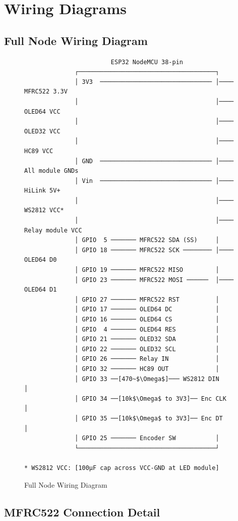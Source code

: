 \chapter{Wiring Diagrams}
\label{app:wiring}

\section{Full Node Wiring Diagram}

\begin{figure}[H]
\centering
\begin{verbatim}
                        ESP32 NodeMCU 38-pin
              ┌──────────────────────────────────────┐
              │ 3V3  ─────────────────────────────── │──── MFRC522 3.3V
              │                                      │──── OLED64 VCC
              │                                      │──── OLED32 VCC
              │                                      │──── HC89 VCC
              │ GND  ─────────────────────────────── │──── All module GNDs
              │ Vin  ─────────────────────────────── │──── HiLink 5V+
              │                                      │──── WS2812 VCC*
              │                                      │──── Relay module VCC
              │ GPIO  5 ─────── MFRC522 SDA (SS)     │
              │ GPIO 18 ─────── MFRC522 SCK ──────── │──── OLED64 D0
              │ GPIO 19 ─────── MFRC522 MISO         │
              │ GPIO 23 ─────── MFRC522 MOSI ──────  │──── OLED64 D1
              │ GPIO 27 ─────── MFRC522 RST          │
              │ GPIO 17 ─────── OLED64 DC            │
              │ GPIO 16 ─────── OLED64 CS            │
              │ GPIO  4 ─────── OLED64 RES           │
              │ GPIO 21 ─────── OLED32 SDA           │
              │ GPIO 22 ─────── OLED32 SCL           │
              │ GPIO 26 ─────── Relay IN             │
              │ GPIO 32 ─────── HC89 OUT             │
              │ GPIO 33 ──[470~$\Omega$]─── WS2812 DIN       │
              │ GPIO 34 ──[10k$\Omega$ to 3V3]── Enc CLK   │
              │ GPIO 35 ──[10k$\Omega$ to 3V3]── Enc DT    │
              │ GPIO 25 ─────── Encoder SW           │
              └──────────────────────────────────────┘

* WS2812 VCC: [100µF cap across VCC-GND at LED module]
\end{verbatim}
\caption{Full Node Wiring Diagram}
\label{fig:wiring_full}
\end{figure}

\section{MFRC522 Connection Detail}

